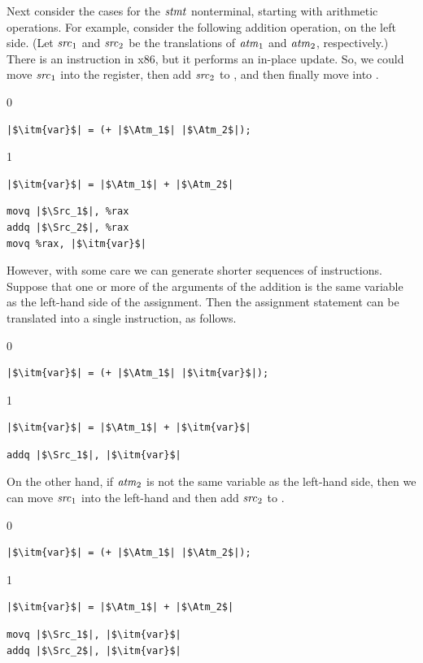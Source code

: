 \documentclass[7x10]{TimesAPriori_MIT}%
\def\racketEd{0}
\def\pythonEd{1}
\def\edition{1}
\newcommand{\pythonColor}[0]{}
\numberwithin{theorem}{chapter}
\numberwithin{definition}{chapter}
\numberwithin{equation}{chapter}
\begin{document}
Next consider the cases for the $\mathit{stmt}$ nonterminal, starting with
arithmetic operations. For example, consider the following addition
operation, on the left side.  (Let $\mathit{src}_1$ and $\mathit{src}_2$ be the
translations of $\mathit{atm}_1$ and $\mathit{atm}_2$, respectively.)  There is an
 instruction in x86, but it performs an in-place update.
%
So, we could move $\mathit{src}_1$ into the  register, then add
$\mathit{src}_2$ to , and then finally move  into . 
\begin{transformation}
{\if\edition\racketEd    
\begin{lstlisting}
|$\itm{var}$| = (+ |$\Atm_1$| |$\Atm_2$|);
\end{lstlisting}
\fi}
{\if\edition\pythonEd\pythonColor
\begin{lstlisting}
|$\itm{var}$| = |$\Atm_1$| + |$\Atm_2$|
\end{lstlisting}
\fi}
\compilesto
\begin{lstlisting}
movq |$\Src_1$|, %rax
addq |$\Src_2$|, %rax
movq %rax, |$\itm{var}$|
\end{lstlisting}
\end{transformation}
%
However, with some care we can generate shorter sequences of
instructions. Suppose that one or more of the arguments of the
addition is the same variable as the left-hand side of the assignment.
Then the assignment statement can be translated into a single
 instruction, as follows.
\begin{transformation}
{\if\edition\racketEd
\begin{lstlisting}
|$\itm{var}$| = (+ |$\Atm_1$| |$\itm{var}$|);
\end{lstlisting}
\fi}
{\if\edition\pythonEd\pythonColor
\begin{lstlisting}
|$\itm{var}$| = |$\Atm_1$| + |$\itm{var}$|
\end{lstlisting}
\fi}    
\compilesto
\begin{lstlisting}
addq |$\Src_1$|, |$\itm{var}$|
\end{lstlisting}
\end{transformation}
%
On the other hand, if $\mathit{atm}_2$ is not the same variable as the
left-hand side, then we can move $\mathit{src}_1$ into the left-hand 
and then add $\mathit{src}_2$ to .
%
\begin{transformation}
{\if\edition\racketEd    
\begin{lstlisting}
|$\itm{var}$| = (+ |$\Atm_1$| |$\Atm_2$|);
\end{lstlisting}
\fi}
{\if\edition\pythonEd\pythonColor
\begin{lstlisting}
|$\itm{var}$| = |$\Atm_1$| + |$\Atm_2$|
\end{lstlisting}
\fi}
\compilesto
\begin{lstlisting}
movq |$\Src_1$|, |$\itm{var}$|
addq |$\Src_2$|, |$\itm{var}$|
\end{lstlisting}
\end{transformation}
\end{document}
